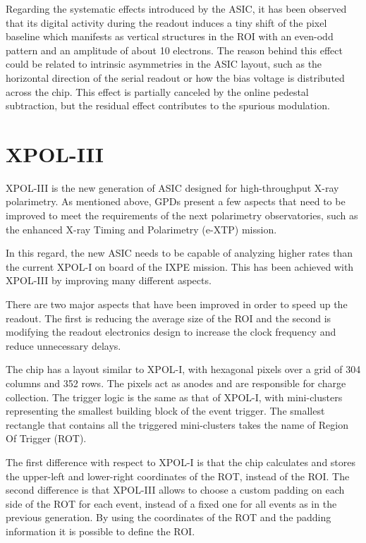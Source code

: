 Regarding the systematic effects introduced by the ASIC, it has been observed that its digital activity during the readout induces a tiny shift of the pixel baseline which manifests as vertical structures in the ROI with an even-odd pattern and an amplitude of about 10 electrons. The reason behind this effect could be related to intrinsic asymmetries in the ASIC layout, such as the horizontal direction of the serial readout or how the bias voltage is distributed across the chip. This effect is partially canceled by the online pedestal subtraction, but the residual effect contributes to the spurious modulation.

\section{XPOL-III}
\label{sec:xpol3}
XPOL-III \cite{minuti2023} is the new generation of ASIC designed for high-throughput X-ray polarimetry. As mentioned above, GPDs present a few aspects that need to be improved to meet the requirements of the next polarimetry observatories, such as the enhanced X-ray Timing and Polarimetry (e-XTP) mission.

In this regard, the new ASIC needs to be capable of analyzing higher rates than the current XPOL-I on board of the IXPE mission. This has been achieved with XPOL-III by improving many different aspects.

There are two major aspects that have been improved in order to speed up the readout. The first is reducing the average size of the ROI and the second is modifying the readout electronics design to increase the clock frequency and reduce unnecessary delays. 

The chip has a layout similar to XPOL-I, with hexagonal pixels over a grid of 304 columns and 352 rows. The pixels act as anodes and are responsible for charge collection. The trigger logic is the same as that of XPOL-I, with mini-clusters representing the smallest building block of the event trigger. The smallest rectangle that contains all the triggered mini-clusters takes the name of Region Of Trigger (ROT).

The first difference with respect to XPOL-I is that the chip calculates and stores the upper-left and lower-right coordinates of the ROT, instead of the ROI. The second difference is that XPOL-III allows to choose a custom padding on each side of the ROT for each event, instead of a fixed one for all events as in the previous generation. By using the coordinates of the ROT and the padding information it is possible to define the ROI.


